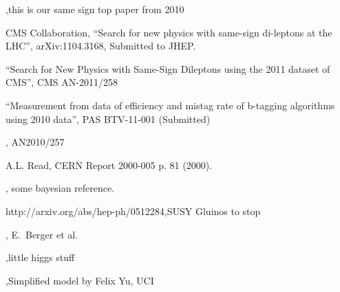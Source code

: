 \begin{thebibliography}{99}

,{this is our same sign top paper from 2010}

 {CMS Collaboration, ``Search for new physics with same-sign di-leptons at the LHC''}, arXiv:1104.3168, Submitted to JHEP.

 {``Search for New Physics with Same-Sign Dileptons using the 2011 dataset of CMS''}, CMS AN-2011/258

 {``Measurement from data of efficiency and mistag rate of b-tagging algorithms using 2010 data''}, PAS BTV-11-001 (Submitted)

, AN2010/257

 {A.L. Read, CERN Report 2000-005 p. 81 (2000).}

, some bayesian reference.

 { http://arxiv.org/abs/hep-ph/0512284},{SUSY Gluinos to stop}

, {E.~Berger et al.}

,{little higgs stuff}

,{Simplified model by Felix Yu, UCI}

\end{thebibliography}








